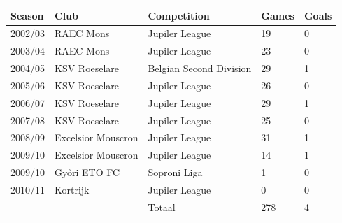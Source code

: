\documentclass{article}
\begin{document}
\begin{tabular}{lllll}
\toprule
Season & Club & Competition & Games & Goals \\
\midrule
2002/03 & RAEC Mons & Jupiler League & 19 & 0 \\
2003/04 & RAEC Mons & Jupiler League & 23 & 0 \\
2004/05 & KSV Roeselare & Belgian Second Division & 29 & 1 \\
2005/06 & KSV Roeselare & Jupiler League & 26 & 0 \\
2006/07 & KSV Roeselare & Jupiler League & 29 & 1 \\
2007/08 & KSV Roeselare & Jupiler League & 25 & 0 \\
2008/09 & Excelsior Mouscron & Jupiler League & 31 & 1 \\
2009/10 & Excelsior Mouscron & Jupiler League & 14 & 1 \\
2009/10 & Győri ETO FC & Soproni Liga & 1 & 0 \\
2010/11 & Kortrijk & Jupiler League & 0 & 0 \\
 &  & Totaal & 278 & 4 \\
\bottomrule
\end{tabular}
\end{document}
